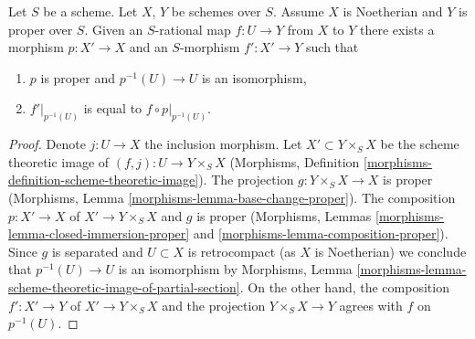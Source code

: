 \begin{lemma}
\label{lemma-extend-rational-map-after-modification}
Let $S$ be a scheme. Let $X$, $Y$ be schemes over $S$.
Assume $X$ is Noetherian and $Y$ is proper over $S$.
Given an $S$-rational map $f : U \to Y$ from $X$ to $Y$
there exists a morphism $p : X' \to X$ and an
$S$-morphism $f' : X' \to Y$ such that
\begin{enumerate}
\item $p$ is proper and $p^{-1}(U) \to U$ is an isomorphism,
\item $f'|_{p^{-1}(U)}$ is equal to $f \circ p|_{p^{-1}(U)}$.
\end{enumerate}
\end{lemma}

\begin{proof}
Denote $j : U \to X$ the inclusion morphism. Let $X' \subset Y \times_S X$
be the scheme theoretic image of $(f, j) : U \to Y \times_S X$
(Morphisms, Definition \ref{morphisms-definition-scheme-theoretic-image}).
The projection $g : Y \times_S X \to X$ is proper
(Morphisms, Lemma \ref{morphisms-lemma-base-change-proper}).
The composition $p : X' \to X$ of $X' \to Y \times_S X$ and $g$ is proper
(Morphisms, Lemmas \ref{morphisms-lemma-closed-immersion-proper} and
\ref{morphisms-lemma-composition-proper}).
Since $g$ is separated and $U \subset X$ is retrocompact (as $X$ is Noetherian)
we conclude that $p^{-1}(U) \to U$ is an isomorphism by
Morphisms, Lemma
\ref{morphisms-lemma-scheme-theoretic-image-of-partial-section}.
On the other hand, the composition $f' : X' \to Y$ of $X' \to Y \times_S X$
and the projection $Y \times_S X \to Y$ agrees with $f$ on $p^{-1}(U)$.
\end{proof}














